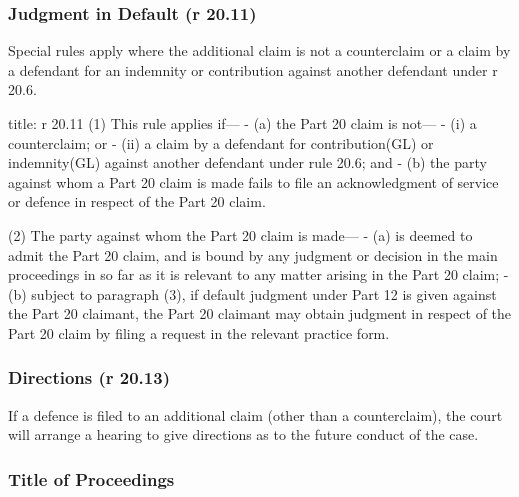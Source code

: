 \documentclass[
]{article}
\newenvironment{Shaded}{}{}
\newcommand{\NormalTok}[1]{#1}
\begin{document}
\hypertarget{judgment-in-default-r-20.11}{%
\subsubsection{Judgment in Default (r
20.11)}\label{judgment-in-default-r-20.11}}

Special rules apply where the additional claim is not a counterclaim or
a claim by a defendant for an indemnity or contribution against another
defendant under r 20.6.

\begin{Shaded}
\begin{Highlighting}[]
\NormalTok{title: r 20.11}
\NormalTok{(1) This rule applies if—}
\NormalTok{{-} (a) the Part 20 claim is not—}
\NormalTok{    {-} (i) a counterclaim; or}
\NormalTok{    {-} (ii) a claim by a defendant for contribution(GL) or indemnity(GL) against another defendant under rule 20.6; and}
\NormalTok{{-} (b) the party against whom a Part 20 claim is made fails to file an acknowledgment of service or defence in respect of the Part 20 claim.}

\NormalTok{(2) The party against whom the Part 20 claim is made—}
\NormalTok{{-} (a) is deemed to admit the Part 20 claim, and is bound by any judgment or decision in the main proceedings in so far as it is relevant to any matter arising in the Part 20 claim;}
\NormalTok{{-} (b) subject to paragraph (3), if default judgment under Part 12 is given against the Part 20 claimant, the Part 20 claimant may obtain judgment in respect of the Part 20 claim by filing a request in the relevant practice form.}
\end{Highlighting}
\end{Shaded}

\hypertarget{directions-r-20.13}{%
\subsubsection{Directions (r 20.13)}\label{directions-r-20.13}}

If a defence is filed to an additional claim (other than a
counterclaim), the court will arrange a hearing to give directions as to
the future conduct of the case.

\hypertarget{title-of-proceedings}{%
\subsubsection{Title of Proceedings}\label{title-of-proceedings}}
\end{document}
